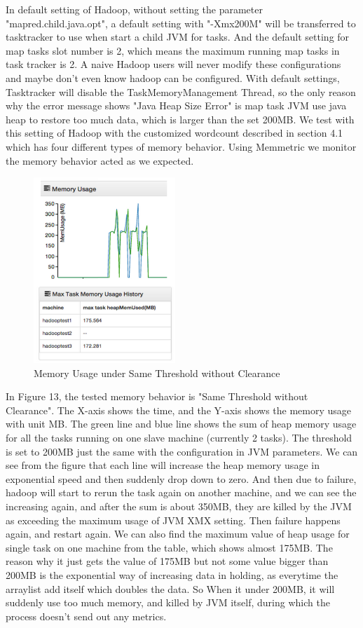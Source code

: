 In default setting of Hadoop, without setting the parameter "mapred.child.java.opt", a default setting with "-Xmx200M" will be transferred to tasktracker to use when start a child JVM for tasks. And the default setting for map tasks slot number is 2, which means the maximum running map tasks in task tracker is 2. A naive Hadoop users will never modify these configurations and maybe don't even know hadoop can be configured.
With default settings, Tasktracker will disable the TaskMemoryManagement Thread, so the only reason why the error message shows "Java Heap Size Error" is map task JVM use java heap to restore too much data, which is larger than the set 200MB.
We test with this setting of Hadoop with the customized wordcount described in section 4.1 which has four different types of memory behavior. Using Memmetric we monitor the memory behavior acted as we expected.

\begin{figure}[ht]
  \centering
    \includegraphics[width=2.1in]{image/test1a.png}
    \caption{Memory Usage under Same Threshold without Clearance}
    \label{ref:memory_allocation}
\end{figure}

In Figure 13, the tested memory behavior is "Same Threshold without Clearance". The X-axis shows the time, and the Y-axis shows the memory usage with unit MB. The green line and blue line shows the sum of heap memory usage for all the tasks running on one slave machine (currently 2 tasks). The threshold is set to 200MB just the same with the configuration in JVM parameters. We can see from the figure that each line will increase the heap memory usage in exponential speed and then suddenly drop down to zero. And then due to failure, hadoop will start to rerun the task again on another machine, and we can see the increasing again, and after the sum is about 350MB, they are killed by the JVM as exceeding the maximum usage of JVM XMX setting. Then failure happens again, and restart again. We can also find the maximum value of heap usage for single task on one machine from the table, which shows almost 175MB. The reason why it just gets the value of 175MB but not some value bigger than 200MB is the exponential way of increasing data in holding, as everytime the arraylist add itself which doubles the data. So When it under 200MB, it will suddenly use too much memory, and killed by JVM itself, during which the process doesn't send out any metrics.

